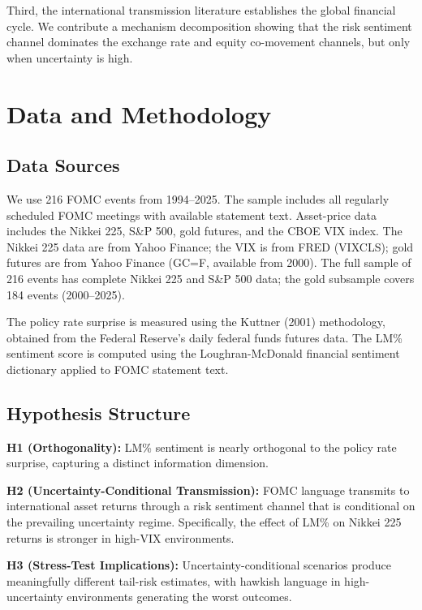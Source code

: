 \documentclass[11pt]{article}
\begin{document}
Third, the international transmission literature \citep{Rey2013, Rey2015} establishes the global financial cycle. We contribute a mechanism decomposition showing that the risk sentiment channel dominates the exchange rate and equity co-movement channels, but only when uncertainty is high.

\section{Data and Methodology}

\subsection{Data Sources}

We use 216 FOMC events from 1994--2025. The sample includes all regularly scheduled FOMC meetings with available statement text. Asset-price data includes the Nikkei 225, S\&P 500, gold futures, and the CBOE VIX index. The Nikkei 225 data are from Yahoo Finance; the VIX is from FRED (VIXCLS); gold futures are from Yahoo Finance (GC=F, available from 2000). The full sample of 216 events has complete Nikkei 225 and S\&P 500 data; the gold subsample covers 184 events (2000--2025).

The policy rate surprise is measured using the Kuttner (2001) methodology, obtained from the Federal Reserve's daily federal funds futures data. The LM\% sentiment score is computed using the Loughran-McDonald financial sentiment dictionary applied to FOMC statement text.

\subsection{Hypothesis Structure}

\textbf{H1 (Orthogonality):} LM\% sentiment is nearly orthogonal to the policy rate surprise, capturing a distinct information dimension.

\textbf{H2 (Uncertainty-Conditional Transmission):} FOMC language transmits to international asset returns through a risk sentiment channel that is conditional on the prevailing uncertainty regime. Specifically, the effect of LM\% on Nikkei 225 returns is stronger in high-VIX environments.

\textbf{H3 (Stress-Test Implications):} Uncertainty-conditional scenarios produce meaningfully different tail-risk estimates, with hawkish language in high-uncertainty environments generating the worst outcomes.
\end{document}
